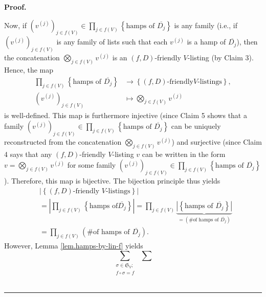 \documentclass[numbers=enddot,12pt,final,onecolumn,notitlepage]{scrartcl}%
\numberwithin{exer}{section}
\theoremstyle{definition}
\newenvironment{proof}[1][Proof]{\noindent\textbf{#1.} }{\ \rule{0.5em}{0.5em}}
\let\sumnonlimits\sum
\let\prodnonlimits\prod
\renewcommand{\sum}{\sumnonlimits\limits}
\renewcommand{\prod}{\prodnonlimits\limits}
\newenvironment{verlong}{}{}
\begin{document}
\begin{verlong}
\begin{proof}
\medskip

Now, if $\left(  v^{\left(  j\right)  }\right)  _{j\in f\left(  V\right)  }%
\in\prod_{j\in f\left(  V\right)  }\left\{  \text{hamps of }\overline{D_{j}%
}\right\}  $ is any family (i.e., if $\left(  v^{\left(  j\right)  }\right)
_{j\in f\left(  V\right)  }$ is any family of lists such that each $v^{\left(
j\right)  }$ is a hamp of $\overline{D_{j}}$), then the concatenation
$\bigotimes\limits_{j\in f\left(  V\right)  }v^{\left(  j\right)  }$ is an
$\left(  f,D\right)  $-friendly $V$-listing (by Claim 3). Hence, the map%
\begin{align*}
\prod_{j\in f\left(  V\right)  }\left\{  \text{hamps of }\overline{D_{j}%
}\right\}   &  \rightarrow\left\{  \left(  f,D\right)  \text{-friendly
}V\text{-listings}\right\}  ,\\
\left(  v^{\left(  j\right)  }\right)  _{j\in f\left(  V\right)  }  &
\mapsto\bigotimes\limits_{j\in f\left(  V\right)  }v^{\left(  j\right)  }%
\end{align*}
is well-defined. This map is furthermore injective (since Claim 5 shows that a
family $\left(  v^{\left(  j\right)  }\right)  _{j\in f\left(  V\right)  }%
\in\prod_{j\in f\left(  V\right)  }\left\{  \text{hamps of }\overline{D_{j}%
}\right\}  $ can be uniquely reconstructed from the concatenation
$\bigotimes\limits_{j\in f\left(  V\right)  }v^{\left(  j\right)  }$) and
surjective (since Claim 4 says that any $\left(  f,D\right)  $-friendly
$V$-listing $v$ can be written in the form $v=\bigotimes\limits_{j\in f\left(
V\right)  }v^{\left(  j\right)  }$ for some family $\left(  v^{\left(
j\right)  }\right)  _{j\in f\left(  V\right)  }\in\prod_{j\in f\left(
V\right)  }\left\{  \text{hamps of }\overline{D_{j}}\right\}  $). Therefore,
this map is bijective. The bijection principle thus yields%
\begin{align*}
&  \left\vert \left\{  \left(  f,D\right)  \text{-friendly }V\text{-listings}%
\right\}  \right\vert \\
&  =\left\vert \prod_{j\in f\left(  V\right)  }\left\{  \text{hamps of
}\overline{D_{j}}\right\}  \right\vert =\prod_{j\in f\left(  V\right)
}\underbrace{\left\vert \left\{  \text{hamps of }\overline{D_{j}}\right\}
\right\vert }_{=\left(  \text{\# of hamps of }\overline{D_{j}}\right)  }\\
&  =\prod_{j\in f\left(  V\right)  }\left(  \text{\# of hamps of }%
\overline{D_{j}}\right)  .
\end{align*}
However, Lemma \ref{lem.hamps-by-lin-f} yields%
\[
\sum_{\substack{\sigma\in\mathfrak{S}_{V};\\f\circ\sigma=f}}\ \ \sum
\]
\end{proof}
\end{verlong}
\end{document}
